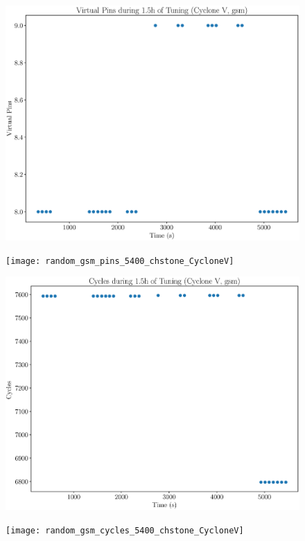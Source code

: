 \documentclass[12pt, a4paper]{article}
\begin{document}
\begin{figure}[htpb]
    \begin{minipage}{.48\textwidth}
        \includegraphics[scale=.25]{gsm_pins_5400_chstone_CycloneV}
    \end{minipage}%
    \hfill
    \begin{minipage}{.48\textwidth}
        \texttt{[image: random\_gsm\_pins\_5400\_chstone\_CycloneV]}
    \end{minipage}%

    \begin{minipage}{.48\textwidth}
        \includegraphics[scale=.25]{gsm_cycles_5400_chstone_CycloneV}
    \end{minipage}%
    \hfill
    \begin{minipage}{.48\textwidth}
        \texttt{[image: random\_gsm\_cycles\_5400\_chstone\_CycloneV]}
    \end{minipage}%
\end{figure}
\end{document}
